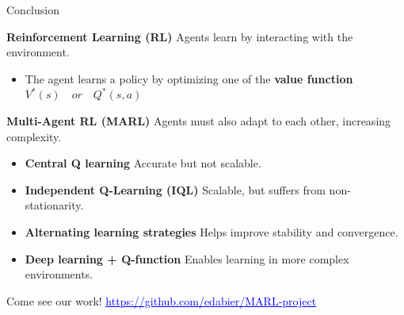 \documentclass[aspectratio=169,xcolor=dvipsnames]{beamer}
\begin{document}
\begin{frame}{Conclusion}
\begin{block}{\textbf{Reinforcement Learning (RL)}}
     Agents learn by interacting with the environment.
    \begin{itemize}
        \item The agent learns a policy by optimizing one of the \textbf{value function} $V^*(s)\quad or\quad Q^*(s,a) $
    \end{itemize}
\end{block}
\begin{block} {\textbf{Multi-Agent RL (MARL)}}
     Agents must also adapt to each other, increasing complexity.
    \begin{itemize}
    \item \textbf{Central Q learning}  Accurate but not scalable.
    \item \textbf{Independent Q-Learning (IQL)}  Scalable, but suffers from non-stationarity.
    \item \textbf{Alternating learning strategies} Helps improve stability and convergence.
    \item \textbf{Deep learning + Q-function} Enables learning in more complex environments.
    \end{itemize}
\end{block}
\vspace{0.5em}
\center
    Come see our work! 
    { \href{https://github.com/edabier/MARL-project}{{\textcolor{blue}{\underline{https://github.com/edabier/MARL-project}}}}}

\end{frame}

\end{document}
